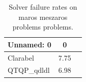 \begin{table}
\caption{Solver failure rates on maros meszaros problems problems.}
\label{t-maros meszaros problems-failure}
\begin{tabular}{lcc}
\toprule
Unnamed: 0 & 0 \\
\midrule
Clarabel & 7.75 \\
QTQP_qdldl & 6.98 \\
\bottomrule
\end{tabular}
\end{table}
